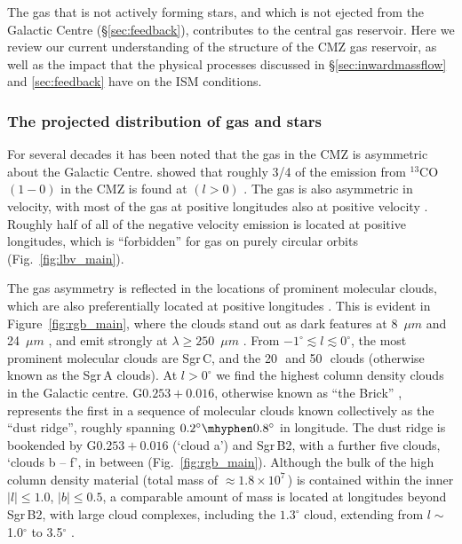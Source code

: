 The gas that is not actively forming stars, and which is not ejected from the Galactic Centre (\S\ref{sec:feedback}), contributes to the central gas reservoir. Here we review our current understanding of the structure of the CMZ gas reservoir, as well as the impact that the physical processes discussed in \S\ref{sec:inwardmassflow} and \ref{sec:feedback} have on the ISM conditions.

\subsubsection{The projected distribution of gas and stars}
\label{sec:gasstardistrib}

For several decades it has been noted that the gas in the CMZ is asymmetric about the Galactic Centre. \citet{Bally1988} showed that roughly 3/4 of the emission from $^{13}$CO $(1-0)$ in the CMZ is found at $(l>0)$ \citep[see Fig.~\ref{fig:lbv_main} and][]{Dame2001, Lis2001, Bally2010, Molinari2011, Longmore2013a, Eden2020}.
The gas is also asymmetric in velocity, with most of the gas at positive longitudes also at positive velocity \citep{Bally1988, Henshaw2016b}. Roughly half of all of the negative velocity emission is located at positive longitudes, which is ``forbidden'' for gas on purely circular orbits (Fig.~\ref{fig:lbv_main}).

The gas asymmetry is reflected in the locations of prominent molecular clouds, which are also preferentially located at positive longitudes \citep{Bally2010,Longmore2013a}. 
This is evident in Figure~\ref{fig:rgb_main}, where the clouds stand out as dark features at 8~$\mu m$ and 24~$\mu m$ \citep{Churchwell2009, Carey2009}, and emit strongly at $\lambda\geq250$~$\mu m$ \citep{Molinari2010, Molinari2011}. 
From $-1^{\circ}\lesssim l\lesssim0^{\circ}$, the most prominent molecular clouds are Sgr\,C, and the 20\,\kms \ and 50\,\kms \ clouds (otherwise known as the Sgr\,A clouds).
At $l>0^{\circ}$ we find the highest column density clouds in the Galactic centre. G$0.253+0.016$, otherwise known as ``the Brick'' \citep{Lis1998}, represents the first in a sequence of molecular clouds known collectively as the ``dust ridge'', roughly spanning $0.2^{\circ} \mhyphen 0.8^{\circ}$ in longitude. 
The dust ridge is bookended by G$0.253+0.016$ (`cloud a') and Sgr\,B2, with a further five clouds, `clouds b -- f', in between (Fig.~\ref{fig:rgb_main}). Although the bulk of the high column density material (total mass of $\approx1.8\times10^{7}$\,\msun) is contained within the inner $|l| \leq 1.0$, $|b| \leq 0.5$, a comparable amount of mass is located at longitudes beyond Sgr\,B2, with large cloud complexes, including the $1.3^{\circ}$ cloud, extending from $l \sim$ 1.0$^{\circ}$ to 3.5$^{\circ}$ \citep{Molinari2011, Longmore2013b}.

